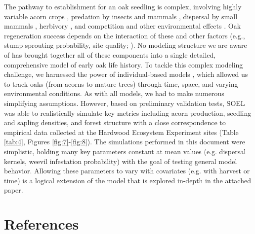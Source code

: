 \documentclass[
11pt, %
a4paper, %
oneside, %
headinclude,footinclude, %
]{scrartcl}
\begin{document}
The pathway to establishment for an oak seedling is complex, involving highly variable acorn crops \citep{Lusk2007, Kellner2014b}, predation by insects and mammals \citep{Bellocq2005, Lombardo2008, Kellner2014b}, dispersal by small mammals \citep{Moore2007,Kellner2016}, herbivory \citep{Kellner2016c}, and competition and other environmental effects \citep{Kellner2016b}. Oak regeneration success depends on the interaction of these and other factors (e.g., stump sprouting probability, site quality; \citealp{Johnson2009}). No modeling structure we are aware of has brought together all of these components into a single detailed, comprehensive model of early oak life history. To tackle this complex modeling challenge, we harnessed the power of individual-based models \citep{Grimm2005}, which allowed us to track oaks (from acorns to mature trees) through time, space, and varying environmental conditions. As with all models, we had to make numerous simplifying assumptions. However, based on preliminary validation tests, SOEL was able to realistically simulate key metrics including acorn production, seedling and sapling densities, and forest structure with a close correspondence to empirical data collected at the Hardwood Ecosystem Experiment sites (Table \ref{tab:4}, Figures \ref{fig:7}-\ref{fig:8}). The simulations performed in this document were simplistic, holding many key parameters constant at mean values (e.g. dispersal kernels, weevil infestation probability) with the goal of testing general model behavior. Allowing these parameters to vary with covariates (e.g. with harvest or time) is a logical extension of the model that is explored in-depth in the attached paper. 


\section{References}

\renewcommand{\bibsection}{}


\end{document}
